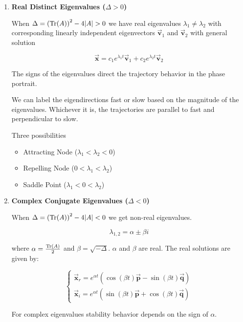 \documentclass[12pt, landscape, twocolumn]{article}
\let\oldvec\vec
\renewcommand{\vec}[1]{\oldvec{\mathbf{ #1 } } }                    %
\begin{document}
    \begin{enumerate}
        \item \textbf{Real Distinct Eigenvalues ($\Delta > 0$)}

            When $\Delta = {({\rm Tr}(A))}^2 - 4|A| > 0$ we have real eigenvalues $\lambda_1 \neq \lambda_2$ with corresponding linearly independent eigenvectors $\vec{v}_1$ and $\vec{v}_2$ with general solution

            \[ \vec{x} = c_1 e^{\lambda_1 t} \vec{v}_1 + c_2 e^{\lambda_2 t} \vec{v}_2 \]

            The signs of the eigenvalues direct the trajectory behavior in the phase portrait.

            We can label the eigendirections fast or slow based on the magnitude of the eigenvalues. Whichever it is, the trajectories are parallel to fast and perpendicular to slow.

            Three possibilities

                \begin{itemize}
                    \item Attracting Node ($\lambda_1 < \lambda_2 < 0$)
                    \item Repelling Node ($0 < \lambda_1 < \lambda_2$)
                    \item Saddle Point ($\lambda_1 < 0 < \lambda_2$)
                \end{itemize}

            \item \textbf{Complex Conjugate Eigenvalues ($\Delta < 0$)}

                When $\Delta = {({\rm Tr}(A))}^2 - 4|A| < 0$ we get non-real eigenvalues.

                \[ \lambda_{1,2} = \alpha \pm \beta i \]

                where $\alpha = \frac{ {\rm Tr}(A)}{2}$ and $\beta = \sqrt{-\Delta}$. $\alpha$ and $\beta$ are real. The real solutions are given by:

                \[ \begin{cases}
                        \vec{x}_r = e^{\alpha t} ( \cos(\beta t) \vec{p} - \sin(\beta t)\vec{q})\\
                        \vec{x}_i = e^{\alpha t} ( \sin(\beta t) \vec{p} + \cos(\beta t)\vec{q})
                    \end{cases} \]

                For complex eigenvalues stability behavior depends on the sign of $\alpha$.


\end{enumerate}
\end{document}
